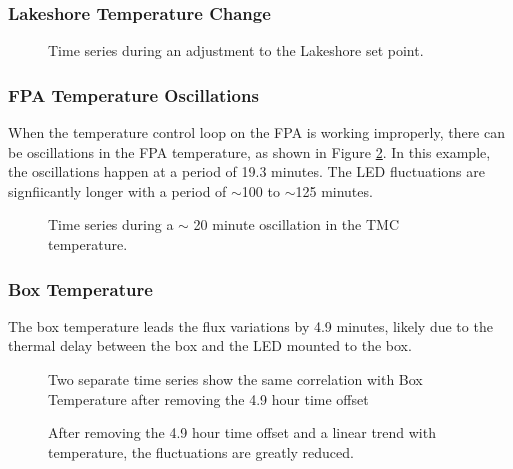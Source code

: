 \documentclass{aastex62}
\begin{document}
\subsubsection{Lakeshore Temperature Change}

\begin{figure}
{}
\caption{Time series during an adjustment to the Lakeshore set point.}\label{fig:indTSeriesLakeshore39p7}
\end{figure}

\subsubsection{FPA Temperature Oscillations}
When the temperature control loop on the FPA is working improperly, there can be oscillations in the FPA temperature, as shown in Figure \ref{fig:indTSeriesTMCoscillations}.
In this example, the oscillations happen at a period of 19.3 minutes.
The LED fluctuations are signfiicantly longer with a period of $\sim$100 to $\sim$125 minutes.

\begin{figure}
{}
\caption{Time series during a $\sim$ 20 minute oscillation in the TMC temperature.}\label{fig:indTSeriesTMCoscillations}
\end{figure}

\clearpage
\subsubsection{Box Temperature}
The box temperature leads the flux variations by 4.9 minutes, likely due to the thermal delay between the box and the LED mounted to the box.

\begin{figure}
{}
\caption{Two separate time series show the same correlation with Box Temperature after removing the 4.9 hour time offset}\label{fig:LEDTcorrelation}
\end{figure}

\begin{figure}
{}\label{fig:LEDTcorrection}
\caption{After removing the 4.9 hour time offset and a linear trend with temperature, the fluctuations are greatly reduced.}
\end{figure}
\end{document}
